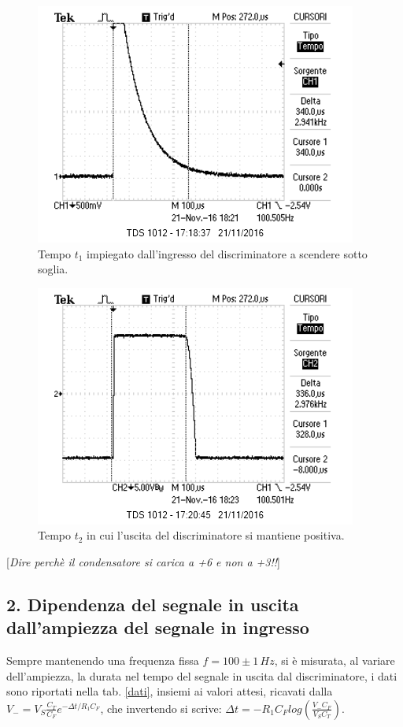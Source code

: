 \documentclass[10pt,a4paper]{article}
\newcommand{\rem}[1]{[\emph{#1}]}
\begin{document}
\begin{figure}[htb!]
\centering
\includegraphics[scale=1.0]{immagini/periodoEsponenziale.png}
\caption{Tempo $t_1$ impiegato dall'ingresso del discriminatore a scendere sotto soglia.}
\label{tempoEspo}
\end{figure}

\begin{figure}[htb!]
\centering
\includegraphics[scale=1.0]{immagini/tempoQuadra.png}
\caption{Tempo $t_2$ in cui l'uscita del discriminatore si mantiene positiva.}
\label{tempoUscita}
\end{figure}

\rem{Dire perchè il condensatore si carica a +6 e non a +3!!}


\subsection*{2. Dipendenza del segnale in uscita dall'ampiezza del segnale in ingresso}

Sempre mantenendo una frequenza fissa $f = 100 \pm 1 \, Hz$, si è misurata, al variare dell'ampiezza, la durata nel tempo del segnale in uscita dal discriminatore, i dati sono riportati nella tab. \ref{dati}, insiemi ai valori attesi, ricavati dalla $V_-=V_S \frac{C_T}{C_F} e^{- \Delta t/R_1 C_F}$, che invertendo si scrive: $\Delta t = -R_1 C_F log\left( \frac{V_- C_F}{V_S C_T}\right)$.
\end{document}
